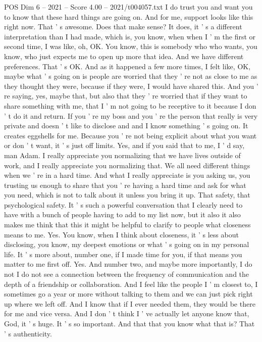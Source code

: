 \begin{textsample}{POS Dim 6 – 2021 – Score 4.00 – 2021/t004057.txt}
I do trust you and want you to know that these hard things are going on.
And for me, support looks like this right now.
That ' s awesome.
Does that make sense?
It does, it ' s a different interpretation than I had made, which is, you know, when when I ' m the first or second time, I was like, oh, OK.
You know, this is somebody who who wants, you know, who just expects me to open up more that idea.
And we have different preferences.
That ' s OK.
And as it happened a few more times, I felt like, OK, maybe what ' s going on is people are worried that they ' re not as close to me as they thought they were, because if they were, I would have shared this.
And you ' re saying, yes, maybe that, but also that they ' re worried that if they want to share something with me, that I ' m not going to be receptive to it because I don ' t do it and return.
If you ' re my boss and you ' re the person that really is very private and doesn ' t like to disclose and and I know something ' s going on.
It creates eggshells for me.
Because you ' re not being explicit about what you want or don ' t want, it ' s just off limits.
Yes, and if you said that to me, I ' d say, man Adam.
I really appreciate you normalizing that we have lives outside of work, and I really appreciate you normalizing that.
We all need different things when we ' re in a hard time.
And what I really appreciate is you asking us, you trusting us enough to share that you ' re having a hard time and ask for what you need, which is not to talk about it unless you bring it up.
That safety, that psychological safety.
It ' s such a powerful conversation that I clearly need to have with a bunch of people having to add to my list now, but it also it also makes me think that this it might be helpful to clarify to people what closeness means to me.
Yes.
You know, when I think about closeness, it ' s less about disclosing, you know, my deepest emotions or what ' s going on in my personal life.
It ' s more about, number one, if I made time for you, if that means you matter to me first off.
Yes.
And number two, and maybe more importantly, I do not I do not see a connection between the frequency of communication and the depth of a friendship or collaboration.
And I feel like the people I ' m closest to, I sometimes go a year or more without talking to them and we can just pick right up where we left off.
And I know that if I ever needed them, they would be there for me and vice versa.
And I don ' t think I ' ve actually let anyone know that, God, it ' s huge.
It ' s so important.
And that that you know what that is?
That ' s authenticity.

\end{textsample}
